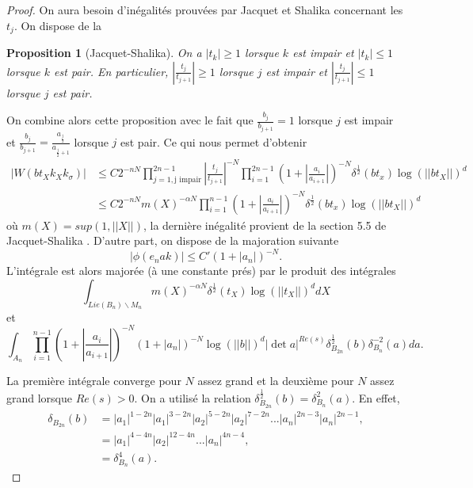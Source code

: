 \documentclass{amsart}
\newtheorem{proposition}{Proposition}[section]
\begin{document}
\begin{proof}
 On aura besoin d'inégalités prouvées par Jacquet et Shalika \cite{jacquet-shalika} concernant les $t_j$. On dispose de la
 \begin{proposition}[Jacquet-Shalika]
 On a $|t_k| \geq 1$ lorsque $k$ est impair et $|t_k| \leq 1$ lorsque $k$ est pair. En particulier, $|\frac{t_j}{t_{j+1}}| \geq 1$ lorsque $j$ est impair et $|\frac{t_j}{t_{j+1}}| \leq 1$ lorsque $j$ est pair.
 \end{proposition}
 
 On combine alors cette proposition avec le fait que $\frac{b_j}{b_{j+1}} = 1$ lorsque $j$ est impair et $\frac{b_j}{b_{j+1}} = \frac{a_\frac{j}{2}}{a_{\frac{j}{2}+1}}$ lorsque $j$ est pair. Ce qui nous permet d'obtenir
 \begin{align}
 |W(bt_Xk_Xk_\sigma)| &\leq C 2^{-nN} \prod_{j=1, \text{j impair}}^{2n-1} |\frac{t_j}{t_{j+1}}|^{-N} \prod_{i=1}^{2n-1} (1 + |\frac{a_i}{a_{i+1}}|)^{-N} \delta^{\frac{1}{2}}(bt_x)\log(||bt_X||)^d \\
 &\leq C 2^{-nN} m(X)^{-\alpha N} \prod_{i=1}^{n-1} (1 + |\frac{a_i}{a_{i+1}}|)^{-N} \delta^{\frac{1}{2}}(bt_x)\log(||bt_X||)^d
 \end{align}
 où $m(X) = sup(1, ||X||)$, la dernière inégalité provient de la section 5.5 de Jacquet-Shalika \cite{jacquet-shalika}. D'autre part, on dispose de la majoration suivante
 \begin{equation}
 |\phi(e_nak)| \leq C'(1+|a_n|)^{-N}.
 \end{equation}
 L'intégrale est alors majorée (à une constante prés) par le produit des intégrales
 \begin{equation}
 \int_{Lie(B_n)\backslash{M_n}} m(X)^{-\alpha N} \delta^{\frac{1}{2}}(t_X)\log(||t_X||)^d dX
 \end{equation}
 et
 \begin{equation}
 \int_{A_n}  \prod_{i=1}^{n-1} (1+ |\frac{a_i}{a_{i+1}}|)^{-N} (1+|a_n|)^{-N}\log(||b||)^d|\det a|^{Re(s)} \delta_{B_{2n}}^{\frac{1}{2}}(b)\delta_{B_n}^{-2}(a) da.
 \end{equation}
 
 La première intégrale converge pour $N$ assez grand et la deuxième pour $N$ assez grand lorsque $Re(s) > 0$. On a utilisé la relation $\delta_{B_{2n}}^{\frac{1}{2}}(b) = \delta_{B_n}^2(a)$. En effet,
 \begin{align}
 \delta_{B_{2n}}(b) &= |a_1|^{1-2n}|a_1|^{3-2n}|a_2|^{5-2n}|a_2|^{7-2n}...|a_n|^{2n-3}|a_n|^{2n-1}, \\
 &= |a_1|^{4-4n}|a_2|^{12-4n}...|a_n|^{4n-4},\\
 &= \delta_{B_n}^4(a).
 \end{align}
  \end{proof}
  
\end{document}
